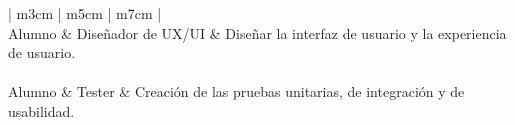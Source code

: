 \begin{table}[H]
\begin{tabular}{ | m{3cm} | m{5cm} | m{7cm} | }
		                                                                                                                                      \\ \hline
		Alumno           & Diseñador de UX/UI             & Diseñar la interfaz de usuario y la experiencia de usuario.                                                               \\ \hline
		                                                                                                                                     \\ \hline
		Alumno           & Tester                         & Creación de las pruebas unitarias, de integración y de usabilidad.                                                        \\
		\bottomrule
	\end{tabular}
	\caption{Organización de los equipos de trabajo}
\end{table}